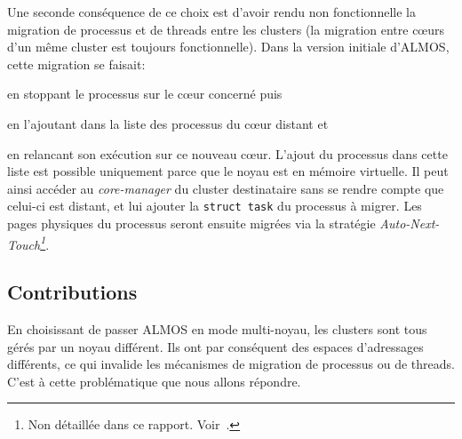       Une seconde conséquence de ce choix est d'avoir rendu non fonctionnelle la
      migration de processus et de threads entre les clusters (la migration
      entre c\oe urs d'un même cluster est toujours fonctionnelle). Dans la
      version initiale d'ALMOS, cette migration se faisait:\benumline \item en
      stoppant le processus sur le c\oe ur concerné puis \item en l'ajoutant
      dans la liste des processus du c\oe ur distant et\item en relancant son
      exécution sur ce nouveau c\oe ur\eenumline. L'ajout du processus dans
      cette liste est possible uniquement parce que le noyau est en mémoire
      virtuelle. Il peut ainsi accéder au \textit{core-manager} du cluster
      destinataire sans se rendre compte que celui-ci est distant, et lui
      ajouter la \texttt{struct task} du processus à migrer. Les pages physiques
      du processus seront ensuite migrées via la stratégie
      \textit{Auto-Next-Touch\footnote{Non détaillée dans ce
          rapport. Voir~\citep{almaless2014universite}.}}.

    \subsection{Contributions}

      En choisissant de passer ALMOS en mode multi-noyau, les clusters sont tous
      gérés par un noyau différent. Ils ont par conséquent des espaces
      d'adressages différents, ce qui invalide les mécanismes de migration de
      processus ou de threads. C'est à cette problématique que nous allons
      répondre.


